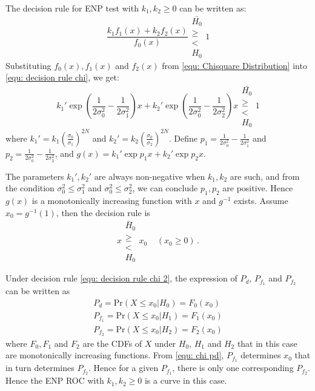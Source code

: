 \documentclass[12pt,journal,a4paper,twoside,onecolumn,draft]{IEEEtran}
\begin{document}
\begin{spacing}{2.5}
The decision rule for ENP test with $k_1, k_2 \geq 0$ can be written as:
\begin{equation}
\label{equ: decision rule chi}
  \frac{k_1f_1(x) + k_2f_2(x)}{f_0(x)} \substack{\bar{H_0} \\ \geq \\ < \\ H_0} 1
\end{equation}
Substituting $f_0(x), f_1(x)$ and $f_2(x)$ from \eqref{equ: Chisquare Distribution} into \eqref{equ: decision rule chi}, we get:
\begin{equation}
  \label{equ: decision rule chi 1}
  k_1'\exp{(\frac{1}{2\sigma_0^2} - \frac{1}{2\sigma_1^2})x} + k_2'\exp{(\frac{1}{2\sigma_0^2} - \frac{1}{2\sigma_2^2})x} \substack{\bar{H_0} \\ \geq \\ < \\ H_0} 1
\end{equation}
where $k_1' = k_1(\frac{\sigma_0}{\sigma_1})^{2N}$ and $k_2' = k_2(\frac{\sigma_0}{\sigma_2})^{2N}$. Define $p_1 = \frac{1}{2\sigma_0^2} - \frac{1}{2\sigma_1^2}$ and $p_2 = \frac{1}{2\sigma_0^2} - \frac{1}{2\sigma_2^2}$, and $g(x) =  k_1'\exp{p_1x}+k_2'\exp{p_2x}$.

The parameters $k_1', k_2'$ are always non-negative when $k_1, k_2$ are such, and from 
 the condition $\sigma_0^2 \leq \sigma_1^2$ and $\sigma_0^2 \leq \sigma_2^2$,  we can conclude $p_1, p_2$ are positive. Hence $g(x)$ is a monotonically increasing function with $x$ and $g^{-1}$ exists. Assume $x_0 = g^{-1}(1)$, then the decision rule is
\begin{equation}
  \label{equ: decision rule chi 2}
  x \substack{\bar{H}_0 \\ \geq \\ < \\ H_0} x_0\;\;\;\;(x_0 \geq 0)\,.
\end{equation}

Under decision rule \eqref{equ: decision rule chi 2}, the expression of $P_d$, $P_{f_1}$ and $P_{f_2}$ can be written as
\begin{equation}
\label{equ: chi pd}
  \begin{split}
    P_d = \text{Pr}(X \leq x_0 | H_0) = F_0(x_0)\\
        P_{f_1} = \text{Pr}(X \leq x_0 | H_1) = F_1(x_0)\\
            P_{f_2} = \text{Pr}(X \leq x_0 | H_2) = F_2(x_0)
  \end{split}
\end{equation}
where $F_0, F_1$ and  $F_2$  are the CDFs of $X$ under $H_0$, $H_1$ and $H_2$ that in this case are monotonically increasing functions.
From \eqref{equ: chi pd},  $P_{f_1}$ determines $x_0$ that in turn determines $P_{f_2}$. Hence for a given $P_{f_1}$, there is only one corresponding $P_{f_2}$. Hence the ENP ROC with $k_1, k_2 \geq 0$ is a curve in this case.


\end{spacing}
\end{document}
